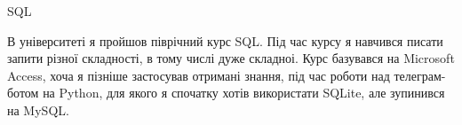 \documentclass[10pt, letterpaper]{article}
\begin{document}
\begin{onecolentry}
\begin{highlightsforbulletentries}
            \item SQL
            

            В університеті я пройшов піврічний курс SQL. 
            Під час курсу я навчився писати запити різної складності, в тому числі дуже складноі. 
            Курс базувався на Microsoft Access, хоча я пізніше застосував отримані знання, під час роботи над телеграм-ботом на Python, для якого я спочатку хотів використати SQLite, але зупинився на MySQL.
            

            \end{highlightsforbulletentries}
        \end{onecolentry}
\end{document}
